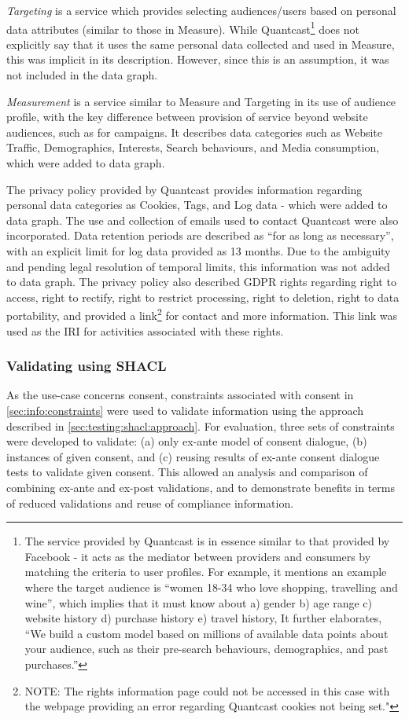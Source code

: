 \textit{Targeting} is a service which provides selecting audiences/users based on personal data attributes (similar to those in Measure). While Quantcast\footnote{The service provided by Quantcast is in essence similar to that provided by Facebook - it acts as the mediator between providers and consumers by matching the criteria to user profiles. For example, it mentions an example where the target audience is ``women 18-34 who love shopping, travelling and wine'', which implies that it must know about a) gender b) age range c) website history d) purchase history e) travel history, It further elaborates, ``We build a custom model based on millions of available data points about your audience, such as their pre-search behaviours, demographics, and past purchases.''} does not explicitly say that it uses the same personal data collected and used in Measure, this was implicit in its description. However, since this is an assumption, it was not included in the data graph.

\textit{Measurement} is a service similar to Measure and Targeting in its use of audience profile, with the key difference between provision of service beyond website audiences, such as for campaigns. It describes data categories such as Website Traffic, Demographics, Interests, Search behaviours, and Media consumption, which were added to data graph.

The privacy policy provided by Quantcast provides information regarding personal data categories as Cookies, Tags, and Log data - which were added to data graph. 
The use and collection of emails used to contact Quantcast were also incorporated.
Data retention periods are described as ``for as long as necessary'', with an explicit limit for log data provided as 13 months. Due to the ambiguity and pending legal resolution of temporal limits, this information was not added to data graph.
The privacy policy also described GDPR rights regarding right to access, right to rectify, right to restrict processing, right to deletion, right to data portability, and provided a link\footnote{NOTE: The rights information page could not be accessed in this case with the webpage providing an error regarding Quantcast cookies not being set."} for contact and more information. This link was used as the IRI for activities associated with these rights.

\subsubsection{Validating using SHACL}
As the use-case concerns consent, constraints associated with consent in \autoref{sec:info:constraints} were used to validate information using the approach described in \autoref{sec:testing:shacl:approach}.
For evaluation, three sets of constraints were developed to validate: (a) only ex-ante model of consent dialogue, (b) instances of given consent, and (c) reusing results of ex-ante consent dialogue tests to validate given consent.
This allowed an analysis and comparison of combining ex-ante and ex-post validations, and to demonstrate benefits in terms of reduced validations and reuse of compliance information.

